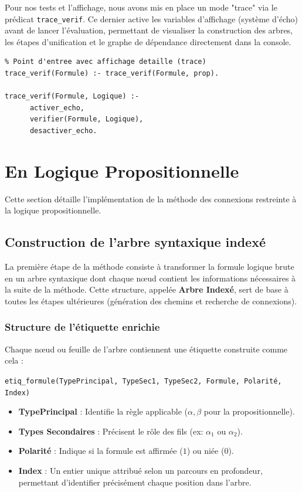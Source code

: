 \documentclass[12pt, a4paper]{article}
\begin{document}
Pour nos tests et l'affichage, nous avons mis en place un mode "trace" via le prédicat \texttt{trace\_verif}. Ce dernier active les variables d'affichage (système d'écho) avant de lancer l'évaluation, permettant de visualiser la construction des arbres, les étapes d'unification et le graphe de dépendance directement dans la console.

\begin{lstlisting}
% Point d'entree avec affichage detaille (trace)
trace_verif(Formule) :- trace_verif(Formule, prop).

trace_verif(Formule, Logique) :-
      activer_echo,
      verifier(Formule, Logique),
      desactiver_echo.
\end{lstlisting}

\section{En Logique Propositionnelle}

Cette section détaille l'implémentation de la méthode des connexions restreinte à la logique propositionnelle.

\subsection{Construction de l'arbre syntaxique indexé}

La première étape de la méthode consiste à transformer la formule logique brute en un arbre syntaxique dont chaque nœud contient les informations nécessaires à la suite de la méthode. Cette structure, appelée \textbf{Arbre Indexé}, sert de base à toutes les étapes ultérieures (génération des chemins et recherche de connexions).

\subsubsection{Structure de l'étiquette enrichie}

Chaque nœud ou feuille de l'arbre contiennent une étiquette construite comme cela :
\begin{center}
    \texttt{etiq\_formule(TypePrincipal, TypeSec1, TypeSec2, Formule, Polarité, Index)}
\end{center}

\begin{itemize}
    \item \textbf{TypePrincipal} : Identifie la règle applicable ($\alpha, \beta$ pour la propositionnelle).
    \item \textbf{Types Secondaires} : Précisent le rôle des fils (ex: $\alpha_1$ ou $\alpha_2$).
    \item \textbf{Polarité} : Indique si la formule est affirmée ($1$) ou niée ($0$).
    \item \textbf{Index} : Un entier unique attribué selon un parcours en profondeur, permettant d'identifier précisément chaque position dans l'arbre.
\end{itemize}
\end{document}
